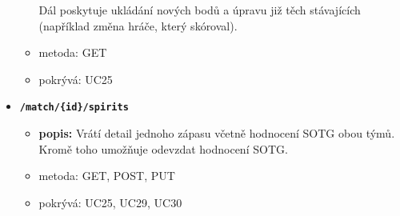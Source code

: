 \begin{itemize}
\begin{itemize}
      Dál poskytuje ukládání nových bodů a úpravu již těch stávajících (například změna hráče, který skóroval).
    \item metoda: GET
    \item pokrývá: UC25
  \end{itemize}
  \item \texttt{\textbf{/match/\{id\}/spirits}}
  \begin{itemize}
    \item \textbf{popis:} Vrátí detail jednoho zápasu včetně hodnocení SOTG obou týmů. Kromě toho umožňuje odevzdat hodnocení SOTG.
    \item metoda: GET, POST, PUT
    \item pokrývá: UC25, UC29, UC30
  \end{itemize}
\end{itemize}
